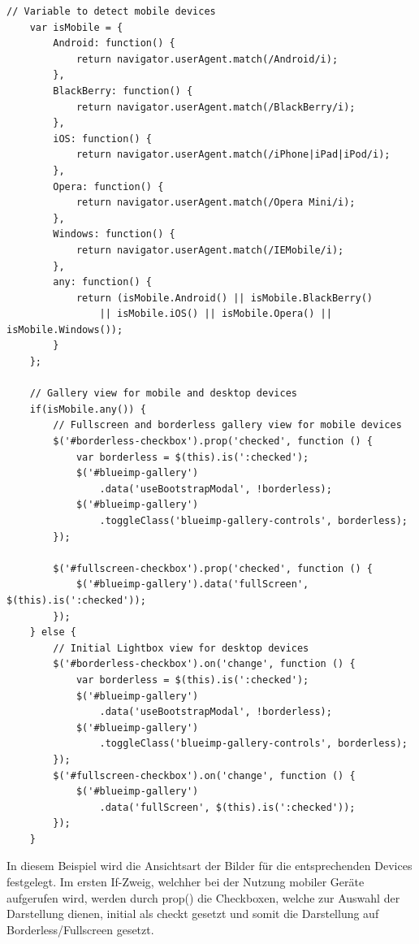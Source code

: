 	\begin{lstlisting}[caption={Auszug aus app.js (Webclient)}, label=list_client]
	// Variable to detect mobile devices
	var isMobile = {
	    Android: function() {
			return navigator.userAgent.match(/Android/i);
		},
		BlackBerry: function() {
			return navigator.userAgent.match(/BlackBerry/i);
		},
		iOS: function() {
			return navigator.userAgent.match(/iPhone|iPad|iPod/i);
		},
		Opera: function() {
			return navigator.userAgent.match(/Opera Mini/i);
		},
		Windows: function() {
			return navigator.userAgent.match(/IEMobile/i);
		},
		any: function() {
			return (isMobile.Android() || isMobile.BlackBerry()
				|| isMobile.iOS() || isMobile.Opera() || isMobile.Windows());
		}
	};
	
	// Gallery view for mobile and desktop devices
	if(isMobile.any()) {
		// Fullscreen and borderless gallery view for mobile devices
		$('#borderless-checkbox').prop('checked', function () {
			var borderless = $(this).is(':checked');
			$('#blueimp-gallery')
				.data('useBootstrapModal', !borderless);
			$('#blueimp-gallery')
				.toggleClass('blueimp-gallery-controls', borderless);
		});
	
		$('#fullscreen-checkbox').prop('checked', function () {
			$('#blueimp-gallery').data('fullScreen', $(this).is(':checked'));
		});
	} else {
		// Initial Lightbox view for desktop devices
		$('#borderless-checkbox').on('change', function () {
			var borderless = $(this).is(':checked');
			$('#blueimp-gallery')
				.data('useBootstrapModal', !borderless);
			$('#blueimp-gallery')
				.toggleClass('blueimp-gallery-controls', borderless);
		});
		$('#fullscreen-checkbox').on('change', function () {
			$('#blueimp-gallery')
				.data('fullScreen', $(this).is(':checked'));
		});
	}	
	\end{lstlisting}
In diesem Beispiel wird die Ansichtsart der Bilder für die entsprechenden Devices 
festgelegt. Im ersten If-Zweig, welchher bei der Nutzung mobiler Geräte aufgerufen 
wird, werden durch prop() die Checkboxen, welche zur Auswahl der Darstellung 
dienen, initial als checkt gesetzt und somit die Darstellung auf Borderless/Fullscreen 
gesetzt.